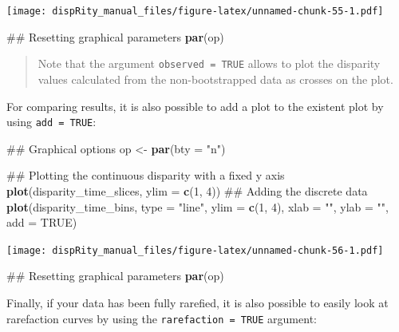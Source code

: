 \documentclass[]{book}
\newenvironment{Shaded}{\begin{snugshade}}{\end{snugshade}}
\newcommand{\KeywordTok}[1]{\textcolor[rgb]{0.13,0.29,0.53}{\textbf{#1}}}
\newcommand{\DataTypeTok}[1]{\textcolor[rgb]{0.13,0.29,0.53}{#1}}
\newcommand{\DecValTok}[1]{\textcolor[rgb]{0.00,0.00,0.81}{#1}}
\newcommand{\StringTok}[1]{\textcolor[rgb]{0.31,0.60,0.02}{#1}}
\newcommand{\OtherTok}[1]{\textcolor[rgb]{0.56,0.35,0.01}{#1}}
\newcommand{\NormalTok}[1]{#1}
\theoremstyle{definition}
\theoremstyle{definition}
\theoremstyle{remark}
\begin{document}
\texttt{[image: dispRity\_manual\_files/figure-latex/unnamed-chunk-55-1.pdf]}

\begin{Shaded}
\begin{Highlighting}[]
\NormalTok{## Resetting graphical parameters}
\KeywordTok{par}\NormalTok{(op)}
\end{Highlighting}
\end{Shaded}

\begin{quote}
Note that the argument \texttt{observed\ =\ TRUE} allows to plot the
disparity values calculated from the non-bootstrapped data as crosses on
the plot.
\end{quote}

For comparing results, it is also possible to add a plot to the existent
plot by using \texttt{add\ =\ TRUE}:

\begin{Shaded}
\begin{Highlighting}[]
\NormalTok{## Graphical options}
\NormalTok{op <-}\StringTok{ }\KeywordTok{par}\NormalTok{(}\DataTypeTok{bty =} \StringTok{"n"}\NormalTok{)}

\NormalTok{## Plotting the continuous disparity with a fixed y axis}
\KeywordTok{plot}\NormalTok{(disparity_time_slices, }\DataTypeTok{ylim =} \KeywordTok{c}\NormalTok{(}\DecValTok{1}\NormalTok{, }\DecValTok{4}\NormalTok{))}
\NormalTok{## Adding the discrete data}
\KeywordTok{plot}\NormalTok{(disparity_time_bins, }\DataTypeTok{type =} \StringTok{"line"}\NormalTok{, }\DataTypeTok{ylim =} \KeywordTok{c}\NormalTok{(}\DecValTok{1}\NormalTok{, }\DecValTok{4}\NormalTok{), }\DataTypeTok{xlab =} \StringTok{""}\NormalTok{, }\DataTypeTok{ylab =} \StringTok{""}\NormalTok{,}
    \DataTypeTok{add =} \OtherTok{TRUE}\NormalTok{)}
\end{Highlighting}
\end{Shaded}

\texttt{[image: dispRity\_manual\_files/figure-latex/unnamed-chunk-56-1.pdf]}

\begin{Shaded}
\begin{Highlighting}[]
\NormalTok{## Resetting graphical parameters}
\KeywordTok{par}\NormalTok{(op)}
\end{Highlighting}
\end{Shaded}

Finally, if your data has been fully rarefied, it is also possible to
easily look at rarefaction curves by using the
\texttt{rarefaction\ =\ TRUE} argument:
\end{document}
